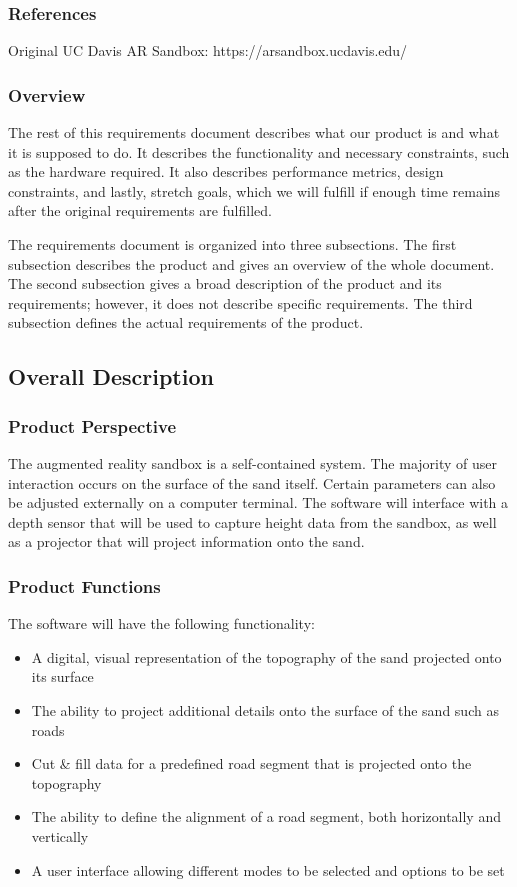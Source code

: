 \subsubsection{References}
Original UC Davis AR Sandbox: https://arsandbox.ucdavis.edu/
\subsubsection{Overview}
The rest of this requirements document describes what our product is and what it is supposed to do. It describes the functionality and necessary constraints, such as the hardware required. It also describes performance metrics, design constraints, and lastly, stretch goals, which we will fulfill if enough time remains after the original requirements are fulfilled.
\par The requirements document is organized into three subsections. The first subsection describes the product and gives an overview of the whole document. The second subsection gives a broad description of the product and its requirements; however, it does not describe specific requirements. The third subsection defines the actual requirements of the product.

\subsection{Overall Description} 
\subsubsection{Product Perspective}
The augmented reality sandbox is a self-contained system. The majority of user interaction occurs on the surface of the sand itself. 
Certain parameters can also be adjusted externally on a computer terminal.
The software will interface with a depth sensor that will be used to capture height data from the sandbox, as well as a projector that will project information onto the sand.

\subsubsection{Product Functions}
The software will have the following functionality:
\begin{itemize}
\item A digital, visual representation of the topography of the sand projected onto its surface
\item The ability to project additional details onto the surface of the sand such as roads
\item Cut \& fill data for a predefined road segment that is projected onto the topography
\item The ability to define the alignment of a road segment, both horizontally and vertically
\item A user interface allowing different modes to be selected and options to be set
\end{itemize}

